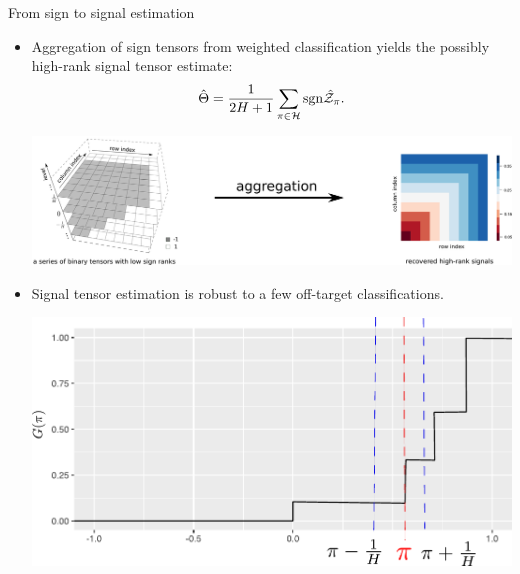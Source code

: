 \documentclass[10pt, mathserif]{beamer} %
\theoremstyle{definition}
\theoremstyle{plain}
\begin{document}
\begin{frame}{From sign to signal estimation}
  
    \begin{itemize}
    \item Aggregation of sign tensors from weighted classification yields the possibly high-rank signal tensor estimate:
    \begin{align}
        \hat\Theta = {1\over 2H+1}\sum_{\pi\in\mathcal{H}}\text{sgn}\hat {\mathcal{Z}}_\pi.
    \end{align}
    \vspace{-.5cm}
        \begin{center}
    \includegraphics[width = .9\textwidth]{Figures/aggregation.pdf}
    \end{center}
    \item Signal tensor estimation is robust to a few off-target classifications. 
    
        \begin{center}
    \includegraphics[width =.4\textwidth]{Figures/cdf_new_ave.pdf}
    \end{center}
    
    \end{itemize}

\end{frame}
\end{document}
